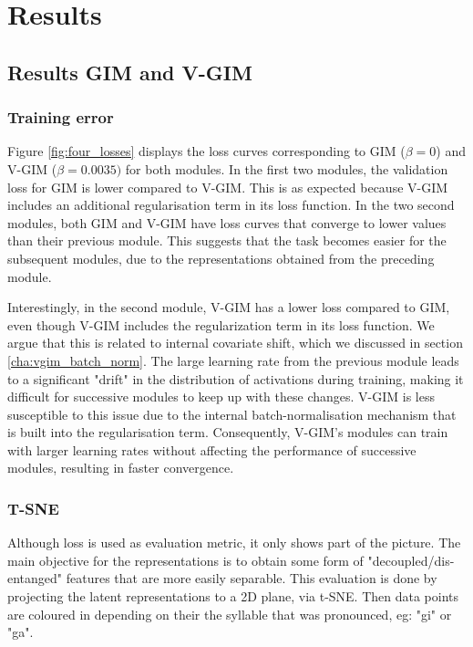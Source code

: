 		

\section{Results}

	\subsection{Results GIM and V-GIM}	
	\subsubsection{Training error}
		
		
		Figure \ref{fig:four_losses} displays the loss curves corresponding to GIM ($\beta=0$) and V-GIM ($\beta=0.0035)$ for both modules. In the first two modules, the validation loss for GIM is lower compared to V-GIM. This is as expected because V-GIM includes an additional regularisation term in its loss function. In the two second modules, both GIM and V-GIM have loss curves that converge to lower values than their previous module. This suggests that the task becomes easier for the subsequent modules, due to the representations obtained from the preceding module.
		
		Interestingly, in the second module, V-GIM has a lower loss compared to GIM, even though V-GIM includes the regularization term in its loss function. We argue that this is related to internal covariate shift, which we discussed in section \ref{cha:vgim_batch_norm}. The large learning rate from the previous module leads to a significant "drift" in the distribution of activations during training, making it difficult for successive modules to keep up with these changes. V-GIM is less susceptible to this issue due to the internal batch-normalisation mechanism that is built into the regularisation term. Consequently, V-GIM's modules can train with larger learning rates without affecting the performance of successive modules, resulting in faster convergence.
		
		
		  



		
	\subsubsection{T-SNE}
			Although loss is used as evaluation metric, it only shows part of the picture. The main objective for the representations is to obtain some form of "decoupled/dis-entanged" features that are more easily separable. This evaluation is done by projecting the latent representations to a 2D plane, via t-SNE. Then data points are coloured in depending on their the syllable that was pronounced, eg: "gi" or "ga".
	
